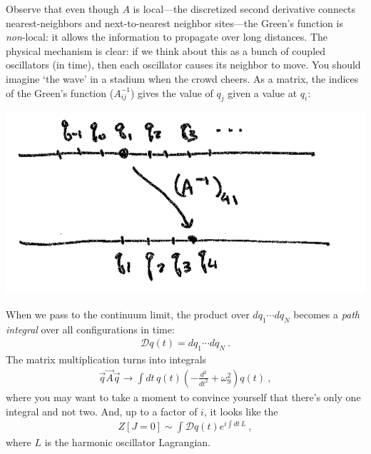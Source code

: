 Observe that even though $A$ is local---the discretized second derivative connects nearest-neighbors and next-to-nearest neighbor sites---the Green's function is \emph{non}-local: it allows the information to propagate over long distances. The physical mechanism is clear: if we think about this as a bunch of coupled oscillators (in time), then each oscillator causes its neighbor to move. You should imagine `the wave' in a stadium when the crowd cheers. As a matrix, the indices of the Green's function ($A^{-1}_{ij}$) gives the value of $q_j$ given a value at $q_i$:
\begin{center}
\includegraphics[width=.4\textwidth]{figures/P230b_2Ainv.png}
\end{center}
When we pass to the continuum limit, the product over $dq_1\cdots dq_N$ becomes a \emph{path integral} over all configurations in time:
\begin{align}
	\mathcal Dq(t) = dq_1\cdots dq_N \ .
\end{align}
The matrix multiplication turns into integrals
\begin{align}
	\vec{q}\vec{A}\vec{q} \to \int dt\, q(t) \left(-\frac{d^2}{dt^2} + \omega_9^2\right) q(t) \ ,
\end{align}
where you may want to take a moment to convince yourself that there's only one integral and not two. And, up to a factor of $i$, it looks like the 
\begin{align}
	Z[J=0] \sim \int \mathcal Dq(t) e^{i\int dt\, L} \ ,
\end{align}
where $L$ is the harmonic oscillator Lagrangian.


